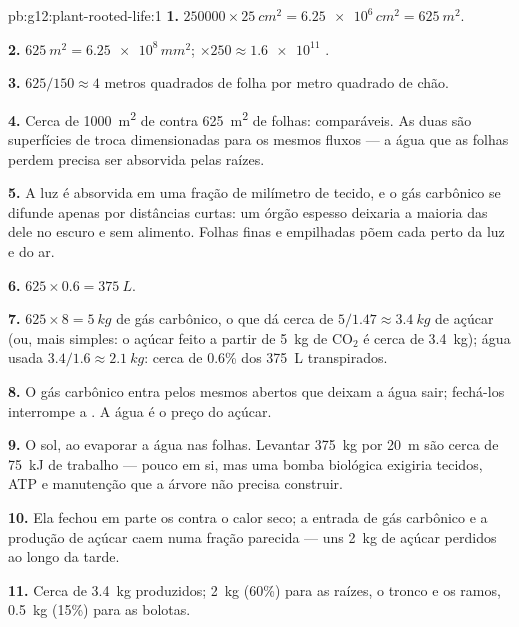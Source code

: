 \begin{solution}{pb:g12:plant-rooted-life:1}
\textbf{1.} $\num{250000} \times \qty{25}{cm^2} = \num{6.25e6}\,
\unit{cm^2} = \qty{625}{m^2}$.

\textbf{2.} $\qty{625}{m^2} = \num{6.25e8}\,\unit{mm^2}$; $\times 250
\approx \num{1.6e11}$ .

\textbf{3.} $625/150 \approx 4$ metros quadrados de folha por metro
quadrado de chão.

\textbf{4.} Cerca de \qty{1000}{m^2} de  contra
\qty{625}{m^2} de folhas: comparáveis. As duas são superfícies de troca
dimensionadas para os mesmos fluxos --- a água que as folhas perdem
precisa ser absorvida pelas raízes.

\textbf{5.} A luz é absorvida em uma fração de milímetro de tecido, e o
gás carbônico se difunde apenas por distâncias curtas: um órgão espesso
deixaria a maioria das  dele no escuro e sem alimento. Folhas
finas e empilhadas põem cada  perto da luz e do ar.

\textbf{6.} $625 \times 0.6 = \qty{375}{L}$.

\textbf{7.} $625 \times 8 = \qty{5}{kg}$ de gás carbônico, o que dá
cerca de $5/1.47 \approx \qty{3.4}{kg}$ de açúcar (ou, mais simples: o
açúcar feito a partir de \qty{5}{kg} de $\mathrm{CO_2}$ é cerca de
\qty{3.4}{kg}); água usada $3.4/1.6 \approx \qty{2.1}{kg}$: cerca de
0.6\% dos \qty{375}{L} transpirados.

\textbf{8.} O gás carbônico entra pelos mesmos  abertos que
deixam a água sair; fechá-los interrompe a . A água é o
preço do açúcar.

\textbf{9.} O sol, ao evaporar a água nas folhas. Levantar
\qty{375}{kg} por \qty{20}{m} são cerca de \qty{75}{kJ} de trabalho ---
pouco em si, mas uma bomba biológica exigiria tecidos, ATP e
manutenção que a árvore não precisa construir.

\textbf{10.} Ela fechou em parte os  contra o calor seco; a
entrada de gás carbônico e a produção de açúcar caem numa fração
parecida --- uns \qty{2}{kg} de açúcar perdidos ao longo da tarde.

\textbf{11.} Cerca de \qty{3.4}{kg} produzidos; \qty{2}{kg} (60\%) para
as raízes, o tronco e os ramos, \qty{0.5}{kg} (15\%) para as bolotas.


\end{solution}
